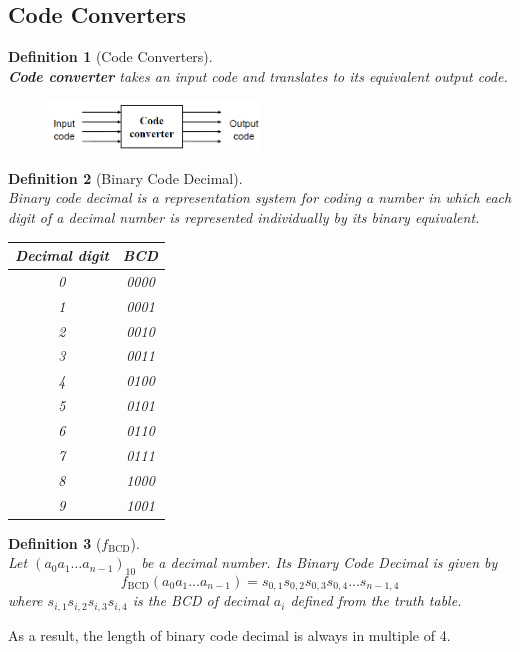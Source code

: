 \documentclass[12pt]{article}
\newtheorem{definition}{Definition}[section]
\theoremstyle{definition}
\begin{document}
\subsection{Code Converters}
\begin{definition}[Code Converters]
\hfill\\\normalfont \textbf{Code converter} takes an input code and translates to its equivalent output code.
\end{definition}
\begin{figure}[h]
\centering
\includegraphics[width = 0.5\textwidth]{6_3.png}
\end{figure}
\begin{definition}[Binary Code Decimal]
\hfill\\\normalfont Binary code decimal is a representation system for coding a number in which each digit of a decimal number is represented individually by its binary equivalent.
\begin{table}[h]
\centering
\begin{tabular}{|c|c|}
\hline
Decimal digit&BCD\\\hline
0&0000\\\hline
1&0001\\\hline
2&0010\\\hline
3&0011\\\hline
4&0100\\\hline
5&0101\\\hline
6&0110\\\hline
7&0111\\\hline
8&1000\\\hline
9&1001\\\hline
\end{tabular}
\end{table}
\end{definition}
\begin{definition}[$f_\text{BCD}$]
\hfill\\\normalfont Let $(a_0a_1\ldots a_{n-1})_10$ be a decimal number. Its Binary Code Decimal is given by
\[
f_\text{BCD}(a_0a_1\ldots a_{n-1}) = s_{0,1}s_{0,2}s_{0,3}s_{0,4}\ldots s_{n-1,4}
\]
where $s_{i,1}s_{i,2}s_{i,3}s_{i,4}$ is the BCD of decimal $a_i$ defined from the truth table.
\end{definition}
As a result, the length of binary code decimal is always in multiple of 4.%
\end{document}
